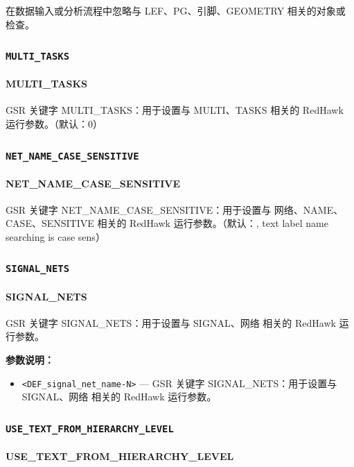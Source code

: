 在数据输入或分析流程中忽略与 LEF、PG、引脚、GEOMETRY 相关的对象或检查。

\subsubsection{\texttt{MULTI_TASKS}}
\paragraph*{MULTI_TASKS}

GSR 关键字 MULTI_TASKS：用于设置与 MULTI、TASKS 相关的 RedHawk 运行参数。（默认：0）

\subsubsection{\texttt{NET_NAME_CASE_SENSITIVE}}
\paragraph*{NET_NAME_CASE_SENSITIVE}

GSR 关键字 NET_NAME_CASE_SENSITIVE：用于设置与 网络、NAME、CASE、SENSITIVE 相关的 RedHawk 运行参数。（默认：, text label name searching is case sens）

\subsubsection{\texttt{SIGNAL_NETS}}
\paragraph*{SIGNAL_NETS}

GSR 关键字 SIGNAL_NETS：用于设置与 SIGNAL、网络 相关的 RedHawk 运行参数。

\textbf{参数说明：}
\begin{itemize}
\item \texttt{<DEF\_signal\_net\_name-N>} — GSR 关键字 SIGNAL\_NETS：用于设置与 SIGNAL、网络 相关的 RedHawk 运行参数。
\end{itemize}

\subsubsection{\texttt{USE_TEXT_FROM_HIERARCHY_LEVEL}}
\paragraph*{USE_TEXT_FROM_HIERARCHY_LEVEL}

